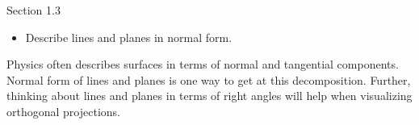 \documentclass{problemset}
\begin{document}
\begin{lesson}

	Section 1.3

	\begin{itemize}
		\item Describe lines and planes in normal form.
	\end{itemize}

	Physics often describes surfaces in terms of normal and tangential components.
	Normal form of lines and planes is one way to get at this decomposition. Further, thinking
	about lines and planes in terms of right angles will help when visualizing orthogonal projections.

\end{lesson}
\end{document}
